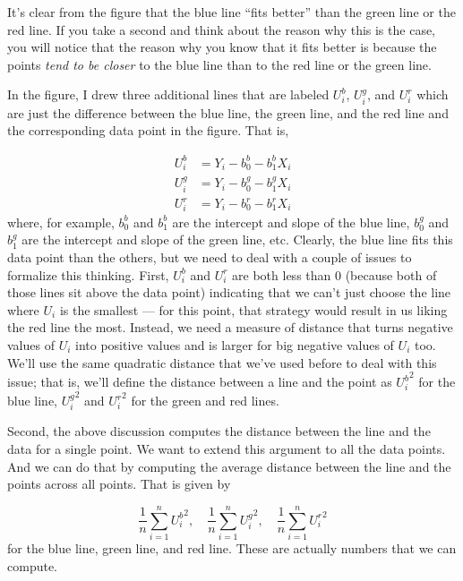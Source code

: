 \documentclass[
  letterpaper,
  DIV=11,
  numbers=noendperiod]{scrreprt}
\begin{document}
It's clear from the figure that the blue line ``fits better'' than the
green line or the red line. If you take a second and think about the
reason why this is the case, you will notice that the reason why you
know that it fits better is because the points \emph{tend to be closer}
to the blue line than to the red line or the green line.

In the figure, I drew three additional lines that are labeled \(U_i^b\),
\(U_i^g\), and \(U_i^r\) which are just the difference between the blue
line, the green line, and the red line and the corresponding data point
in the figure. That is,

\[
  \begin{aligned}
  U_i^b &= Y_i - b_0^b - b_1^b X_i \\
  U_i^g &= Y_i - b_0^g - b_1^g X_i \\
  U_i^r &= Y_i - b_0^r - b_1^r X_i
  \end{aligned}
\] where, for example, \(b_0^b\) and \(b_1^b\) are the intercept and
slope of the blue line, \(b_0^g\) and \(b_1^g\) are the intercept and
slope of the green line, etc. Clearly, the blue line fits this data
point than the others, but we need to deal with a couple of issues to
formalize this thinking. First, \(U_i^b\) and \(U_i^r\) are both less
than 0 (because both of those lines sit above the data point) indicating
that we can't just choose the line where \(U_i\) is the smallest --- for
this point, that strategy would result in us liking the red line the
most. Instead, we need a measure of distance that turns negative values
of \(U_i\) into positive values and is larger for big negative values of
\(U_i\) too. We'll use the same quadratic distance that we've used
before to deal with this issue; that is, we'll define the distance
between a line and the point as \({U_i^b}^2\) for the blue line,
\({U_i^g}^2\) and \({U_i^r}^2\) for the green and red lines.

Second, the above discussion computes the distance between the line and
the data for a single point. We want to extend this argument to all the
data points. And we can do that by computing the average distance
between the line and the points across all points. That is given by

\[
  \frac{1}{n}\sum_{i=1}^n {U_i^b}^2, \quad \frac{1}{n}\sum_{i=1}^n {U_i^g}^2, \quad \frac{1}{n}\sum_{i=1}^n {U_i^r}^2
\] for the blue line, green line, and red line. These are actually
numbers that we can compute.
\end{document}
